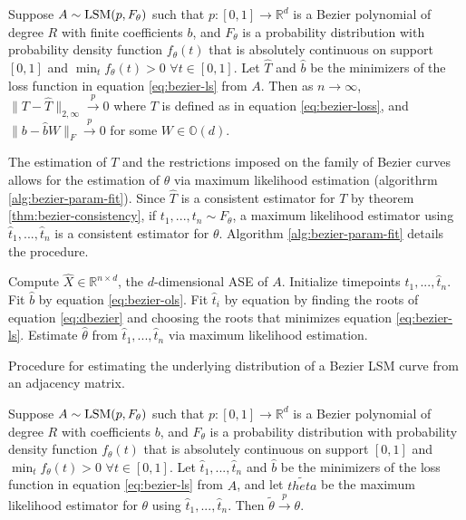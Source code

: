 \documentclass[12pt]{article}
\begin{document}
\begin{theorem}
\label{thm:bezier-consistency}
Suppose $A \sim \mathrm{LSM}(p, F_\theta)$ such that $p : [0, 1] \to \mathbb{R}^d$ is a Bezier polynomial of degree $R$ with finite coefficients $b$, and $F_\theta$ is a probability distribution with probability density function $f_\theta(t)$ that is absolutely continuous on support $[0, 1]$ and $\min_t f_\theta(t) > 0$ $\forall t \in [0, 1]$. 
Let $\hat{T}$ and $\hat{b}$ be the minimizers of the loss function in equation \ref{eq:bezier-ls} from $A$. 
Then as $n \to \infty$, $\|T - \hat{T}\|_{2, \infty} \stackrel{p}{\to} 0$ where $T$ is defined as in equation \ref{eq:bezier-loss}, and $\|b - \hat{b} W \|_F \stackrel{p}{\to} 0$ for some $W \in \mathbb{O}(d)$.
\end{theorem}

The estimation of \(T\) and the restrictions imposed on the family of
Bezier curves allows for the estimation of \(\theta\) via maximum
likelihood estimation (algorithrm \ref{alg:bezier-param-fit}). Since
\(\hat{T}\) is a consistent estimator for \(T\) by theorem
\ref{thm:bezier-consistency}, if \(t_1, ..., t_n \sim F_\theta\), a
maximum likelihood estimator using \(\hat{t}_1, ..., \hat{t}_n\) is a
consistent estimator for \(\theta\). Algorithm
\ref{alg:bezier-param-fit} details the procedure.

\begin{algorithm}[H]
\label{alg:bezier-param-fit}
\DontPrintSemicolon
\SetAlgoLined
{}
Compute $\hat{X} \in \mathbb{R}^{n \times d}$, the $d$-dimensional ASE of $A$.\;
Initialize timepoints $\hat{t}_1, ..., \hat{t}_n$.\;
 {
  Fit $\hat{b}$ by equation \ref{eq:bezier-ols}.\;
   {
    Fit $\hat{t}_i$ by equation by finding the roots of equation \ref{eq:dbezier} and choosing the roots that minimizes equation \ref{eq:bezier-ls}.\;
  }
}
Estimate $\hat{\theta}$ from $\hat{t}_1, ..., \hat{t}_n$ via maximum likelihood estimation.\; 
\caption{Procedure for estimating the underlying distribution of a Bezier LSM curve from an adjacency matrix.}
\end{algorithm}

\begin{theorem}
\label{thm:theta-consistency}
Suppose $A \sim \mathrm{LSM}(p, F_\theta)$ such that $p : [0, 1] \to \mathbb{R}^d$ is a Bezier polynomial of degree $R$ with coefficients $b$, and $F_\theta$ is a probability distribution with probability density function $f_\theta(t)$ that is absolutely continuous on support $[0, 1]$ and $\min_t f_\theta(t) > 0$ $\forall t \in [0, 1]$. 
Let $\hat{t}_1, ..., \hat{t}_n$ and $\hat{b}$ be the minimizers of the loss function in equation \ref{eq:bezier-ls} from $A$, and let $\tilde{theta}$ be the maximum likelihood estimator for $\theta$ using $\hat{t}_1, ..., \hat{t}_n$. 
Then $\tilde{\theta} \stackrel{p}{\to} \theta$. 
\end{theorem}
\end{document}
